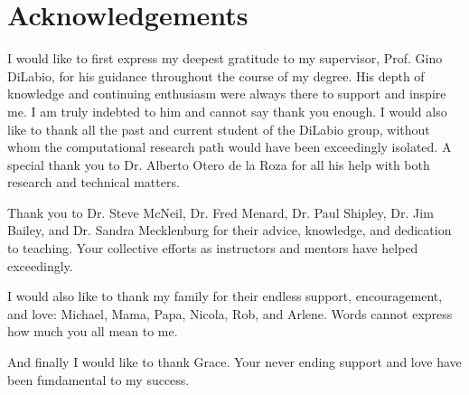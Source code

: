 
\chapter{Acknowledgements}      %

\begin{doublespace}

I would like to first express my deepest gratitude to my supervisor, Prof. Gino
DiLabio, for his guidance throughout the course of my degree. His depth of
knowledge and continuing enthusiasm were always there to support and inspire
me. I am truly indebted to him and cannot say thank you enough. I would also
like to thank all the past and current student of the DiLabio group, without
whom the computational research path would have been exceedingly isolated. A
special thank you to Dr. Alberto Otero de la Roza for all his help with both
research and technical matters.

Thank you to Dr. Steve McNeil, Dr. Fred Menard, Dr. Paul Shipley, Dr. Jim
Bailey, and Dr. Sandra Mecklenburg for their advice, knowledge, and dedication
to teaching. Your collective efforts as instructors and mentors have helped
exceedingly.

I would also like to thank my family for their endless support, encouragement,
and love: Michael, Mama, Papa, Nicola, Rob, and Arlene. Words cannot express how
much you all mean to me.

And finally I would like to thank Grace. Your never ending support and love have been fundamental to my success.

\end{doublespace}

